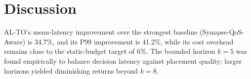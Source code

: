 \section{Discussion}
AL-TO's mean-latency improvement over the strongest baseline (Synapse-QoS-Aware) is 34.7\%, and its P99 improvement is 41.2\%, while its cost overhead remains close to the static-budget target of 6\%. The bounded horizon $k=5$ was found empirically to balance decision latency against placement quality; larger horizons yielded diminishing returns beyond $k=8$.
